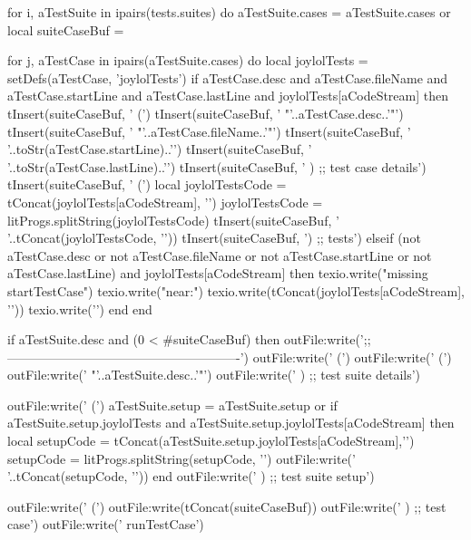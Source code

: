   for i, aTestSuite in ipairs(tests.suites) do
    aTestSuite.cases = aTestSuite.cases or { }
    local suiteCaseBuf = { }

    for j, aTestCase in ipairs(aTestSuite.cases) do
      local joylolTests     = setDefs(aTestCase, 'joylolTests')
      if aTestCase.desc and
        aTestCase.fileName and
        aTestCase.startLine and
        aTestCase.lastLine and
        joylolTests[aCodeStream] then
        tInsert(suiteCaseBuf, '      (\n')
        tInsert(suiteCaseBuf, '        "'..aTestCase.desc..'"\n')
        tInsert(suiteCaseBuf, '        "'..aTestCase.fileName..'"\n')
        tInsert(suiteCaseBuf, '        '..toStr(aTestCase.startLine)..'\n')
        tInsert(suiteCaseBuf, '        '..toStr(aTestCase.lastLine)..'\n')
        tInsert(suiteCaseBuf, '      ) ;; test case details\n')
        tInsert(suiteCaseBuf, '      (\n  ')
        local joylolTestsCode = tConcat(joylolTests[aCodeStream], '\n')
        joylolTestsCode       = litProgs.splitString(joylolTestsCode)
        tInsert(suiteCaseBuf, '    '..tConcat(joylolTestsCode, '\n      '))
        tInsert(suiteCaseBuf, '\n      ) ;; tests\n\n')
      elseif (not aTestCase.desc or
        not aTestCase.fileName or
        not aTestCase.startLine or
        not aTestCase.lastLine) and
        joylolTests[aCodeStream] then
        texio.write("\nERROR missing \\startTestCase\n")
        texio.write("near:\n")
        texio.write(tConcat(joylolTests[aCodeStream], '\n'))
        texio.write('\n')
      end
    end

    if aTestSuite.desc and (0 < #suiteCaseBuf) then
      outFile:write(';;-------------------------------------------------------\n')
      outFile:write('  (\n')
      outFile:write('    (\n')
      outFile:write('      "'..aTestSuite.desc..'"\n')
      outFile:write('    ) ;; test suite details\n\n')

      outFile:write('    (\n')
      aTestSuite.setup = aTestSuite.setup or { }
      if aTestSuite.setup.joylolTests and
        aTestSuite.setup.joylolTests[aCodeStream] then
        local setupCode = tConcat(aTestSuite.setup.joylolTests[aCodeStream],'\n  ')
        setupCode = litProgs.splitString(setupCode, '\n')
        outFile:write('    '..tConcat(setupCode, '\n    '))
      end
      outFile:write('    ) ;; test suite setup\n')

      outFile:write('    (\n')
      outFile:write(tConcat(suiteCaseBuf))
      outFile:write('    ) ;; test case\n')
      outFile:write('    runTestCase\n')

